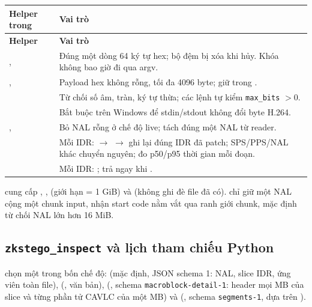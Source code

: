 \documentclass[11pt,a4paper]{article}
\begin{document}
\begin{longtable}{P{.36\textwidth}P{.55\textwidth}}
\toprule\textbf{Helper trong } & \textbf{Vai trò} \\
\midrule\endfirsthead
\toprule\textbf{Helper} & \textbf{Vai trò} \\
\midrule\endhead
{},  & Đúng một dòng 64 ký tự hex; bộ đệm  bị xóa khi hủy. Khóa không bao giờ đi qua argv. \\
,  & Payload hex không rỗng, tối đa 4096 byte; giữ trong . \\
 & Từ chối số âm, tràn, ký tự thừa; các lệnh tự kiểm \texttt{max\_bits} $>0$. \\
 & Bắt buộc trên Windows để stdin/stdout không đổi byte H.264. \\
,  & Bỏ NAL rỗng ở chế độ live; tách đúng một NAL từ reader. \\
 & Mỗi IDR:  $\to$  $\to$ ghi lại đúng IDR đã patch; SPS/PPS/NAL khác chuyển nguyên; đo p50/p95 thời gian mỗi đoạn. \\
 & Mỗi IDR: ; trả ngay khi . \\
\bottomrule\end{longtable}

 cung cấp , ,
 (giới hạn  = 1 GiB) và
 (không ghi đè file đã có).
 chỉ giữ một NAL cộng một chunk input,
nhận start code nằm vắt qua ranh giới chunk, mặc định từ chối NAL lớn hơn 16 MiB.

\subsection{\texorpdfstring{\texttt{zkstego\_inspect}}{zkstego\_inspect} và lịch tham chiếu Python}

 chọn một trong bốn chế độ:
 (mặc định, JSON schema 1: NAL, slice IDR, ứng viên toàn file),
 (, văn bản), 
(, schema \texttt{macroblock-detail-1}: header mọi MB của
slice và từng phần tử CAVLC của một MB) và 
(, schema \texttt{segments-1}, dựa trên
).
\end{document}
